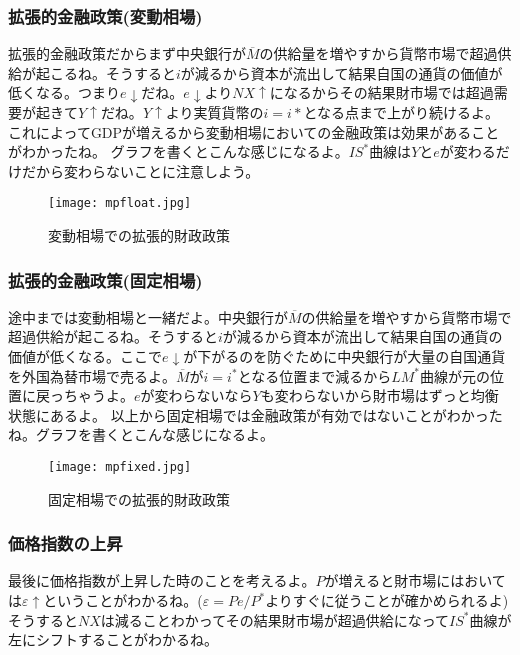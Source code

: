 \documentclass[a4paper, 12pt]{article}
\begin{document}
\subsubsection{拡張的金融政策(変動相場)}
拡張的金融政策だからまず中央銀行が$\overline{M}$の供給量を増やすから貨幣市場で超過供給が起こるね。そうすると$i$が減るから資本が流出して結果自国の通貨の価値が低くなる。つまり$e\downarrow$だね。$e\downarrow$より$NX\uparrow$になるからその結果財市場では超過需要が起きて$Y\uparrow$だね。$Y\uparrow$より実質貨幣の$i=i*$となる点まで上がり続けるよ。
これによってGDPが増えるから変動相場においての金融政策は効果があることがわかったね。
グラフを書くとこんな感じになるよ。$IS^*$曲線は$Y$と$e$が変わるだけだから変わらないことに注意しよう。
\begin{figure}[h]
\begin{center}
\texttt{[image: mpfloat.jpg]}
\caption{変動相場での拡張的財政政策}
\label{}
\end{center}
\end{figure}
\subsubsection{拡張的金融政策(固定相場)}
途中までは変動相場と一緒だよ。中央銀行が$\overline{M}$の供給量を増やすから貨幣市場で超過供給が起こるね。そうすると$i$が減るから資本が流出して結果自国の通貨の価値が低くなる。ここで$e \downarrow$が下がるのを防ぐために中央銀行が大量の自国通貨を外国為替市場で売るよ。$\overline{M}$が$i=i^*$となる位置まで減るから$LM^*$曲線が元の位置に戻っちゃうよ。$e$が変わらないなら$Y$も変わらないから財市場はずっと均衡状態にあるよ。
以上から固定相場では金融政策が有効ではないことがわかったね。グラフを書くとこんな感じになるよ。
\begin{figure}[h]
\begin{center}
\texttt{[image: mpfixed.jpg]}
\caption{固定相場での拡張的財政政策}
\label{}
\end{center}
\end{figure}
\subsubsection{価格指数の上昇}
最後に価格指数が上昇した時のことを考えるよ。$P$が増えると財市場にはおいては$\varepsilon \uparrow$ということがわかるね。($\varepsilon=Pe/P^*$よりすぐに従うことが確かめられるよ)そうすると$NX$は減ることわかってその結果財市場が超過供給になって$IS^*$曲線が左にシフトすることがわかるね。
\end{document}
